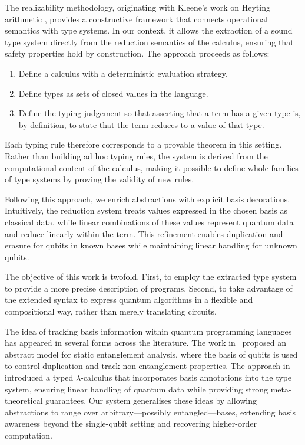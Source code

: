 \documentclass[runningheads,orivec,envcountsame,envcountsect]{llncs}
\begin{document}
The realizability methodology, originating with Kleene's work on Heyting
arithmetic \cite{KleeneJSL45}, provides a constructive framework that connects
operational semantics with type systems. In our context, it allows the
extraction of a sound type system directly from the reduction semantics of the
calculus, ensuring that safety properties hold by construction. The approach
proceeds as follows:
\begin{enumerate}
  \item Define a calculus with a deterministic evaluation strategy.
  \item Define types as sets of closed values in the language.
  \item Define the typing judgement so that asserting that a term has a given
  type is, by definition, to state that the term reduces to a value of that
  type.
\end{enumerate}
Each typing rule therefore corresponds to a provable theorem in this setting.
Rather than building ad hoc typing rules, the system is derived from the
computational content of the calculus, making it possible to define whole
families of type systems by proving the validity of new rules.

Following this approach, we enrich abstractions with explicit basis
decorations. Intuitively, the reduction system treats values expressed in the
chosen basis as classical data, while linear combinations of these values
represent quantum data and reduce linearly within the term. This refinement
enables duplication and erasure for qubits in known bases while maintaining
linear handling for unknown qubits.

The objective of this work is twofold. First, to employ the extracted type
system to provide a more precise description of programs. Second, to take
advantage of the extended syntax to express quantum algorithms in a flexible
and compositional way, rather than merely translating circuits.

The idea of tracking basis information within quantum programming languages has
appeared in several forms across the literature.  
The work in~\cite{Perdrix2008} proposed an abstract model for static
entanglement analysis, where the basis of qubits is used to control duplication
and track non-entanglement properties.  
The approach in~\cite{DiazcaroMonzonAPLAS25} introduced a typed
$\lambda$-calculus that incorporates basis annotations into the type system,
ensuring linear handling of quantum data while providing strong
meta-theoretical guarantees.  
Our system generalises these ideas by allowing abstractions to range over
arbitrary---possibly entangled---bases, extending basis awareness beyond the
single-qubit setting and recovering higher-order computation.
\end{document}
